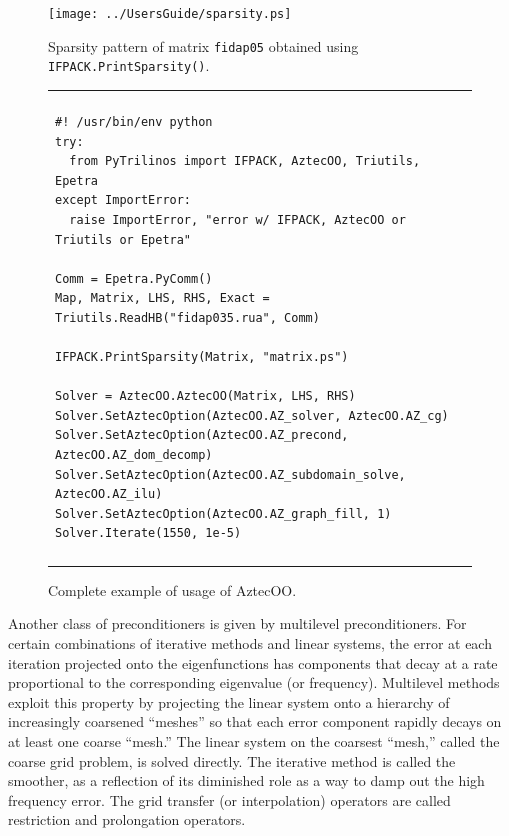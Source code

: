 \documentclass[10pt,relax]{SANDreport}
\begin{document}
\begin{figure}
\begin{center}
\texttt{[image: ../UsersGuide/sparsity.ps]}
\caption{Sparsity pattern of matrix {\tt fidap05} obtained using {\tt
  IFPACK.PrintSparsity()}.}
\label{fig:sparsity}
\end{center}
\end{figure}

\begin{figure}
\begin{center}
\begin{tabular}{| p{12cm} |}
\hline
\\
\footnotesize
\begin{minipage}{11.5cm}
\begin{verbatim}
#! /usr/bin/env python
try:
  from PyTrilinos import IFPACK, AztecOO, Triutils, Epetra
except ImportError:
  raise ImportError, "error w/ IFPACK, AztecOO or Triutils or Epetra"

Comm = Epetra.PyComm()
Map, Matrix, LHS, RHS, Exact = Triutils.ReadHB("fidap035.rua", Comm)

IFPACK.PrintSparsity(Matrix, "matrix.ps")

Solver = AztecOO.AztecOO(Matrix, LHS, RHS)
Solver.SetAztecOption(AztecOO.AZ_solver, AztecOO.AZ_cg)
Solver.SetAztecOption(AztecOO.AZ_precond, AztecOO.AZ_dom_decomp)
Solver.SetAztecOption(AztecOO.AZ_subdomain_solve, AztecOO.AZ_ilu)
Solver.SetAztecOption(AztecOO.AZ_graph_fill, 1)
Solver.Iterate(1550, 1e-5)
\end{verbatim}
\end{minipage}
\\
\\
\hline
\end{tabular}
\caption{Complete example of usage of AztecOO.}
\label{fig:aztecoo}
\end{center}
\end{figure}

\medskip

Another class of preconditioners is given by multilevel
preconditioners.
For certain combinations of iterative methods and
linear systems, the error at each iteration projected onto the
eigenfunctions has components that decay at a rate proportional to the
corresponding eigenvalue (or frequency).  Multilevel methods exploit
this property \cite{Briggs} by projecting the linear system onto a
hierarchy of increasingly coarsened ``meshes'' so that each error
component rapidly decays on at least one coarse ``mesh.''  The linear
system on the coarsest ``mesh,'' called the coarse grid problem, is
solved directly.  The iterative method is called the smoother, as a
reflection of its diminished role as a way to damp out the high
frequency error.  The grid transfer (or interpolation) operators are
called restriction and prolongation
operators.
\end{document}
